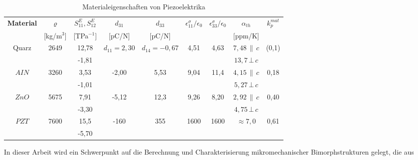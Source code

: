 \begin{table}[htb]
\caption{\label{tabpiezoelektrika}
 Materialeigenschaften von Piezoelektrika}
\begin{center}
\begin{footnotesize}
\begin{tabular}{|c||c|c|c|c|c|c|c|c|}
\hline
{\bf Material} &  $ \varrho  $ &  $ S^{E}_{11}, S^{E}_{12} $ &
$ d_{31} $  &  $ d_{33} $   &  $ \epsilon^{\sigma}_{11} / \epsilon_{0} $ &
$ \epsilon^{\sigma}_{33} / \epsilon_{0} $                                &
$ \alpha_{th} $             &  $ k_{p}^{mat} $ \\
     & [kg/m$^{3}$] &  [TPa$^{-1}$]  & [pC/N]  &  [pC/N] & & & [ppm/K] & \\
\hline \hline
Quarz  &  2649  & 12,78 & $ d_{11} = 2,30 $ & $ d_{14} = -0,67 $ &
4,51   &  4,63  & $ 7,48 \, \| \, c $             & (0,1) \\
       &       &  -1,81 &  &  &  &  & $ 13,7 \, \bot \, c $ & \\
\hline \hline
$AIN$    &  3260  & 3,53  & -2,00  & 5,53 & 9,04 & 11,4 & $ 4,15 \, \| \,
c $ &
                                                              0,18 \\
       &        & -1,01 &        &       &     &      & $ 5,27 \, \bot
\, c $
                                                      & \\
\hline
$ZnO$    &  5675  & 7,91  & -5,12  &  12,3 & 9,26 & 8,20 & $ 2,92 \, \| \,
c $ &
                                                               0,40 \\
       &        & -3,30 &        &       &     &      & $ 4,75 \, \bot
\, c $
                                                      & \\
\hline
$PZT$    &  7600  & 15,5  & -160   &   355 & 1600 & 1600 & $ \approx 7,0 $
                                                       & 0,61 \\
       &        & -5,70 &        &       &      &      &           &
                                                        \\
\hline
\end{tabular}
\end{footnotesize}
\end{center}
\end{table}
In dieser Arbeit wird ein Schwerpunkt auf die Berechnung und
Charakterisierung mikromechanischer Bimorphstrukturen gelegt, die aus
